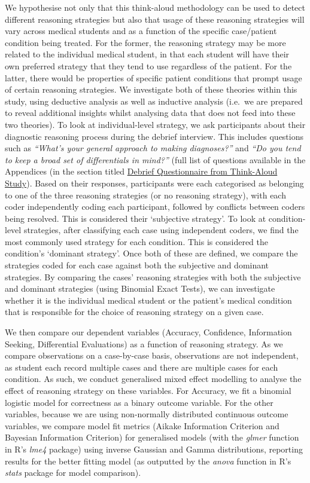 \documentclass[a4paper, nobind]{templates/ociamthesis}
\begin{document}
We hypothesise not only that this think-aloud methodology can be used to detect different reasoning strategies but also that usage of these reasoning strategies will vary across medical students and as a function of the specific case/patient condition being treated. For the former, the reasoning strategy may be more related to the individual medical student, in that each student will have their own preferred strategy that they tend to use regardless of the patient. For the latter, there would be properties of specific patient conditions that prompt usage of certain reasoning strategies. We investigate both of these theories within this study, using deductive analysis as well as inductive analysis (i.e.~we are prepared to reveal additional insights whilst analysing data that does not feed into these two theories). To look at individual-level strategy, we ask participants about their diagnostic reasoning process during the debrief interview. This includes questions such as \emph{``What's your general approach to making diagnoses?''} and \emph{``Do you tend to keep a broad set of differentials in mind?''} (full list of questions available in the Appendices (in the section titled \hyperref[debriefqs]{Debrief Questionnaire from Think-Aloud Study}). Based on their responses, participants were each categorised as belonging to one of the three reasoning strategies (or no reasoning strategy), with each coder independently coding each participant, followed by conflicts between coders being resolved. This is considered their `subjective strategy'. To look at condition-level strategies, after classifying each case using independent coders, we find the most commonly used strategy for each condition. This is considered the condition's `dominant strategy'. Once both of these are defined, we compare the strategies coded for each case against both the subjective and dominant strategies. By comparing the cases' reasoning strategies with both the subjective and dominant strategies (using Binomial Exact Tests), we can investigate whether it is the individual medical student or the patient's medical condition that is responsible for the choice of reasoning strategy on a given case.

\hfill\break
We then compare our dependent variables (Accuracy, Confidence, Information Seeking, Differential Evaluations) as a function of reasoning strategy. As we compare observations on a case-by-case basis, observations are not independent, as student each record multiple cases and there are multiple cases for each condition. As such, we conduct generalised mixed effect modelling to analyse the effect of reasoning strategy on these variables. For Accuracy, we fit a binomial logistic model for correctness as a binary outcome variable. For the other variables, because we are using non-normally distributed continuous outcome variables, we compare model fit metrics (Aikake Information Criterion and Bayesian Information Criterion) for generalised models (with the \emph{glmer} function in R's \emph{lme4} package) using inverse Gaussian and Gamma distributions, reporting results for the better fitting model (as outputted by the \emph{anova} function in R's \emph{stats} package for model comparison).
\end{document}
